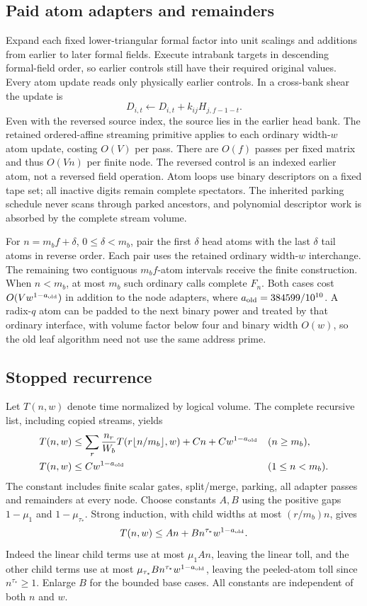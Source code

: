 \subsection{Paid atom adapters and remainders}
Expand each fixed lower-triangular formal factor into unit scalings and
additions from earlier to later formal fields. Execute intrabank targets
in descending formal-field order, so earlier controls still have their
required original values. Every atom update reads only physically earlier
controls. In a cross-bank shear the update is
\[
 D_{i,t}\leftarrow D_{i,t}+k_{ij}H_{j,f-1-t}.
\]
Even with the reversed source index, the source lies in the earlier head
bank. The retained ordered-affine streaming primitive applies to each
ordinary width-$w$ atom update, costing $O(V)$ per pass.
There are $O(f)$ passes per fixed matrix and thus $O(Vn)$ per finite
node. The reversed control is an indexed earlier atom, not a reversed
field operation. Atom loops use binary descriptors on a fixed tape set;
all inactive digits remain complete spectators. The inherited parking
schedule never scans through parked ancestors, and polynomial descriptor
work is absorbed by the complete stream volume.

For $n=m_bf+\delta$, $0\le\delta<m_b$, pair the first $\delta$
head atoms with the last $\delta$ tail atoms in reverse order. Each pair
uses the retained ordinary width-$w$ interchange. The remaining two
contiguous $m_bf$-atom intervals receive the finite construction.
When $n<m_b$, at most $m_b$ such ordinary calls complete $F_n$.
Both cases cost $O(Vw^{1-a_{\rm old}})$ in addition to the node adapters,
where $a_{\rm old}=384599/10^{10}$. A radix-$q$ atom can be padded to
the next binary power and treated by that ordinary interface, with
volume factor below four and binary width $O(w)$, so the old leaf
algorithm need not use the same address prime.

\subsection{Stopped recurrence}
Let $T(n,w)$ denote time normalized by logical volume. The complete
recursive list, including copied streams, yields
\[
\begin{aligned}
 T(n,w)&\le\sum_r\frac{n_r}{W_b}
       T(r\lfloor n/m_b\rfloor,w)+C n+Cw^{1-a_{\rm old}}
                         &&(n\ge m_b),\\
 T(n,w)&\le Cw^{1-a_{\rm old}}&&(1\le n<m_b).
\end{aligned}
\]
The constant includes finite scalar gates, split/merge, parking, all
adapter passes and remainders at every node. Choose constants $A,B$
using the positive gaps $1-\mu_1$ and $1-\mu_{\tau_*}$.
Strong induction, with child widths at most $(r/m_b)n$, gives
\[
 T(n,w)\le An+Bn^{\tau_*}w^{1-a_{\rm old}}.
\]
Indeed the linear child terms use at most $\mu_1 An$, leaving the
linear toll, and the other child terms use at most
$\mu_{\tau_*}Bn^{\tau_*}w^{1-a_{\rm old}}$, leaving the peeled-atom
toll since $n^{\tau_*}\ge1$. Enlarge $B$ for the bounded base cases.
All constants are independent of both $n$ and $w$.

